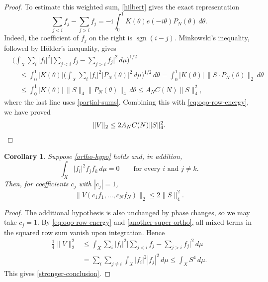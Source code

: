 \documentclass{amsart}
\numberwithin{equation}{section}
\newtheorem{corollary}[theorem]{Corollary}
\begin{document}
\begin{proof}
To estimate this weighted sum, \eqref{hilbert} gives the exact representation
\begin{equation}
\label{eq:oqo-row-kernel}
    \sum_{j<i}f_j-\sum_{j>i}f_j
    =-\mathrm{i}\int_0^1K(\theta)e(-i\theta)P_N(\theta)\,d\theta.
\end{equation}
Indeed, the coefficient of $f_j$ on the right is
$\operatorname{sgn}(i-j)$. Minkowski's inequality, followed by
H\"older's inequality, gives
\begin{align*}
    &\Big(\int_X\sum_i|f_i|^2
      \Big|\sum_{j<i}f_j-\sum_{j>i}f_j\Big|^2\,d\mu\Big)^{1/2}\\
    &\quad\leq\int_0^1|K(\theta)|
      \Big(\int_X\sum_i|f_i|^2|P_N(\theta)|^2\,d\mu\Big)^{1/2}
      \,d\theta=\int_0^1|K(\theta)|\,
      \|S\cdot P_N(\theta)\|_2\,d\theta\\
    &\quad\leq\int_0^1|K(\theta)|\,
      \|S\|_4\|P_N(\theta)\|_4\,d\theta
      \leq A_N C(N)\|S\|_4^2,
\end{align*}
where the last line uses \eqref{partial-sums}.
Combining this with \eqref{eq:oqo-row-energy}, we have proved
\begin{equation}
\label{imaginary-1}
    \|V\|_2\le2A_N C(N)\|S\|_4^2.  \qedhere
\end{equation}

\end{proof}

\begin{samepage}
\begin{corollary}
\label{ortho-cor}
Suppose \eqref{ortho-hypo} holds and, in addition,
\begin{equation}
\label{another-super-ortho}
    \int_X |f_i|^2f_j\overline{f_k} \,d\mu=0
    \qquad\text{for every }i\text{ and }j\ne k.
\end{equation}
Then, for coefficients $c_j$ with $|c_j|=1$,
\begin{equation}
\label{stronger-conclusion}
    \|V(c_1f_1,\ldots,c_N f_N)\|_2\leq 2\|S\|_4^2.
\end{equation}
\end{corollary}
\end{samepage}

\begin{proof}
The additional hypothesis is also unchanged by phase changes, so we may take $c_j=1$. By \eqref{eq:oqo-row-energy} and \eqref{another-super-ortho}, all mixed terms in the squared row sum vanish upon integration. 
Hence
\begin{align*}
    \frac14\|V\|_2^2
    &\leq\int_X\sum_i|f_i|^2
       \Big|\sum_{j<i}f_j-\sum_{j>i}f_j\Big|^2\,d\mu\\
    &=\sum_i\sum_{j\ne i}\int_X|f_i|^2|f_j|^2\,d\mu
      \leq\int_X S^4\,d\mu.
\end{align*}
This gives \eqref{stronger-conclusion}.
\end{proof}
\end{document}
